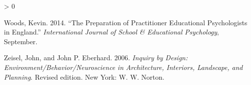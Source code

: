 \documentclass[
]{article}
\newlength{\cslhangindent}
\newenvironment{CSLReferences}[2] %
 {%
  \setlength{\parindent}{0pt}
  \ifodd #1 \everypar{\setlength{\hangindent}{\cslhangindent}}\ignorespaces\fi
  \ifnum #2 > 0
  \setlength{\parskip}{#2\baselineskip}
  \fi
 }%
 {}
\begin{document}
\begin{CSLReferences}{1}{0}
\leavevmode\hypertarget{ref-woodsPreparationPractitionerEducational2014}{}%
Woods, Kevin. 2014. {``The {Preparation} of {Practitioner Educational
Psychologists} in {England}.''} \emph{International Journal of School \&
Educational Psychology}, September.

\leavevmode\hypertarget{ref-zeiselInquiryDesignEnvironment2006}{}%
Zeisel, John, and John P. Eberhard. 2006. \emph{Inquiry by {Design}:
{Environment}/{Behavior}/{Neuroscience} in {Architecture}, {Interiors},
{Landscape}, and {Planning}}. Revised edition. {New York}: {W. W.
Norton}.

\end{CSLReferences}
\end{document}
